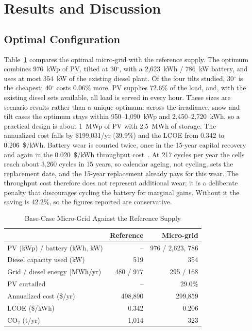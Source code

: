 \section{Results and Discussion}
\label{sec:results}

\subsection{Optimal Configuration}
Table~\ref{tab:base} compares the optimal micro-grid with the reference supply. The optimum combines
976~kWp of PV, tilted at 30$^\circ$, with a 2,623~kWh / 786~kW battery, and uses at most 354~kW of the
existing diesel plant. Of the four tilts studied, 30$^\circ$ is the cheapest; 40$^\circ$ costs 0.06\%
more. PV supplies 72.6\% of the load, and, with the existing diesel sets available, all load is
served in every hour. These sizes are scenario results rather than a unique optimum: across the
irradiance, snow and tilt cases the optimum stays within 950--1,090~kWp and 2,450--2,720~kWh, so a
practical design is about 1~MWp of PV with 2.5~MWh of storage. The annualized cost falls
by \$199,031/yr (39.9\%) and the LCOE from 0.342 to 0.206~\$/kWh. Battery wear is counted twice, once
in the 15-year capital recovery and again in the 0.020~\$/kWh throughput cost~\cite{seger2023}.
At 217 cycles per year the cells reach about 3,260 cycles in 15 years, so calendar ageing, not
cycling, sets the replacement date, and the 15-year replacement already pays for this wear. The
throughput cost therefore does not represent additional wear; it is a deliberate penalty that
discourages cycling the battery for marginal gains. Without it the saving is 42.2\%, so the figures
reported are conservative.

\begin{table}[!t]
\centering
\caption{Base-Case Micro-Grid Against the Reference Supply}
\label{tab:base}
\footnotesize
\setlength{\tabcolsep}{4pt}
\begin{tabular}{@{}l r r@{}}
\toprule
 & Reference & Micro-grid \\
\midrule
PV (kWp) / battery (kWh, kW)  & --      & 976 / 2,623, 786 \\
Diesel capacity used (kW)     & 519     & 354 \\
Grid / diesel energy (MWh/yr) & 480 / 977 & 295 / 168 \\
PV curtailed                  & --      & 29.0\% \\
Annualized cost (\$/yr)       & 498,890 & 299,859 \\
LCOE (\$/kWh)                 & 0.342   & 0.206 \\
CO$_2$ (t/yr)                 & 1,014   & 323 \\
\bottomrule
\end{tabular}
\end{table}

